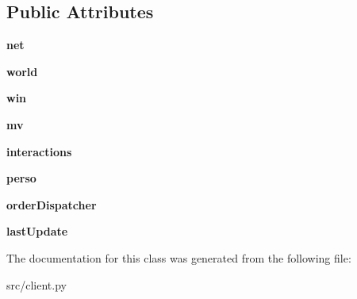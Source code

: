 \subsection*{\-Public \-Attributes}
\begin{DoxyCompactItemize}
\item 
\hypertarget{classsrc_1_1client_1_1_client_a22be7470a4f70a1cd0a5c159221e2080}{{\bfseries net}}\label{classsrc_1_1client_1_1_client_a22be7470a4f70a1cd0a5c159221e2080}

\item 
\hypertarget{classsrc_1_1client_1_1_client_a0c840b0412f44f9220d5c8e7e346527c}{{\bfseries world}}\label{classsrc_1_1client_1_1_client_a0c840b0412f44f9220d5c8e7e346527c}

\item 
\hypertarget{classsrc_1_1client_1_1_client_afe8abeae857a65097ac60b080be20d50}{{\bfseries win}}\label{classsrc_1_1client_1_1_client_afe8abeae857a65097ac60b080be20d50}

\item 
\hypertarget{classsrc_1_1client_1_1_client_a8748a26d6ca1b329739706912b19ee5a}{{\bfseries mv}}\label{classsrc_1_1client_1_1_client_a8748a26d6ca1b329739706912b19ee5a}

\item 
\hypertarget{classsrc_1_1client_1_1_client_ad17d0fea293dd7c11c67a8783530f203}{{\bfseries interactions}}\label{classsrc_1_1client_1_1_client_ad17d0fea293dd7c11c67a8783530f203}

\item 
\hypertarget{classsrc_1_1client_1_1_client_a87fcde6757dca7443d16211dfcb0780f}{{\bfseries perso}}\label{classsrc_1_1client_1_1_client_a87fcde6757dca7443d16211dfcb0780f}

\item 
\hypertarget{classsrc_1_1client_1_1_client_a0c9576fe6e5e83ce95e13bbcbc50c6a2}{{\bfseries order\-Dispatcher}}\label{classsrc_1_1client_1_1_client_a0c9576fe6e5e83ce95e13bbcbc50c6a2}

\item 
\hypertarget{classsrc_1_1client_1_1_client_a6d77243aef6101085f3666d068cefe69}{{\bfseries last\-Update}}\label{classsrc_1_1client_1_1_client_a6d77243aef6101085f3666d068cefe69}

\end{DoxyCompactItemize}


\-The documentation for this class was generated from the following file\-:\begin{DoxyCompactItemize}
\item 
src/client.\-py\end{DoxyCompactItemize}
